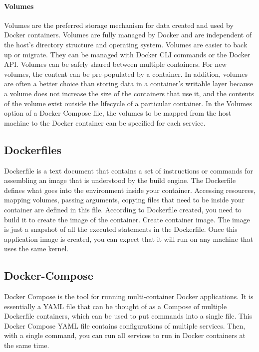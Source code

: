		\paragraph{Volumes}
		Volumes are the preferred storage mechanism for data created and used by Docker containers. Volumes are fully managed by Docker and are independent of the host's directory structure and operating system. Volumes are easier to back up or migrate. They can be managed with Docker CLI commands or the Docker API. Volumes can be safely shared between multiple containers. For new volumes, the content can be pre-populated by a container. In addition, volumes are often a better choice than storing data in a container's writable layer because a volume does not increase the size of the containers that use it, and the contents of the volume exist outside the lifecycle of a particular container. In the Volumes option of a Docker Compose file, the volumes to be mapped from the host machine to the Docker container can be specified for each service.\cite{dockerStorage}
			
		\subsection{Dockerfiles}
		\label{Grundlagen:Docker:Dockerfiles}	
		Dockerfile is a text document that contains a set of instructions or commands for assembling an image that is understood by the build engine. The Dockerfile defines what goes into the environment inside your container. Accessing resources, mapping volumes, passing arguments, copying files that need to be inside your container are defined in this file. According to Dockerfile created, you need to build it to create the image of the container. Create container image. The image is just a snapshot of all the executed statements in the Dockerfile. Once this application image is created, you can expect that it will run on any machine that uses the same kernel. 
		
		\subsection{Docker-Compose}
		\label{Grundlagen:Docker:Docker-Compose}	
		Docker Compose is the tool for running multi-container Docker applications. It is essentially a YAML file that can be thought of as a Compose of multiple Dockerfile containers, which can be used to put commands into a single file. This Docker Compose YAML file contains configurations of multiple services. Then, with a single command, you can run all services to run in Docker containers at the same time.\\

